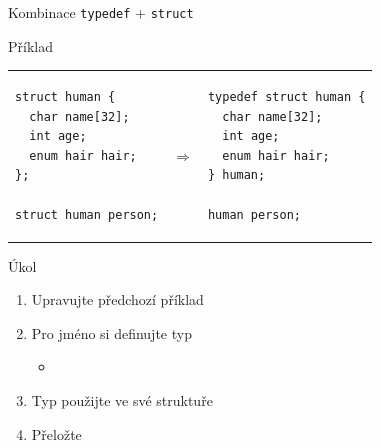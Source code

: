 \begin{frame}[fragile]{Kombinace \texttt{typedef} + \texttt{struct}}


\begin{block}{Příklad}
\begin{tabular}{lll}
\begin{lstlisting}
struct human {
  char name[32];
  int age;
  enum hair hair;
};

struct human person;
\end{lstlisting}
& $\Rightarrow$ &
\begin{lstlisting}
typedef struct human {
  char name[32];
  int age;
  enum hair hair;
} human;

human person;
\end{lstlisting}
\\
\end{tabular}
\end{block}

\end{frame}

\begin{frame}{Úkol}

  \begin{enumerate}
    \item Upravujte předchozí příklad
    \item Pro jméno si definujte typ
    \begin{itemize}
      \item {}
    \end{itemize}

    \item Typ použijte ve své struktuře
    \item Přeložte
  \end{enumerate}

\end{frame}


